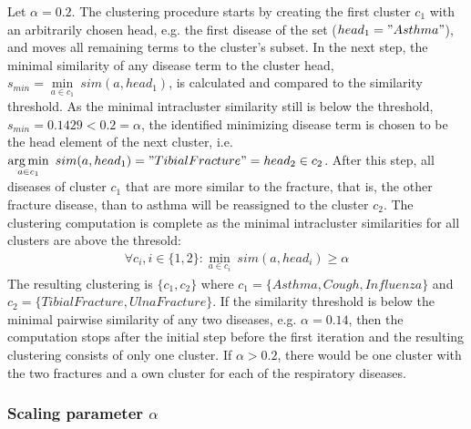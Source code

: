 \begin{exmp}
Let $\alpha=0.2$. The clustering procedure starts by creating the first cluster $c_1$ with an arbitrarily chosen head, e.g. the first disease of the set 
($head_1="Asthma"$), and moves all remaining terms to the cluster's subset. In the next step, the minimal similarity of any disease term to the cluster head, 
$s_{min}=\min\limits_{a \in c_1}~sim(a, head_1)$, is calculated and compared to the similarity threshold. As the minimal intracluster similarity still is below
the threshold, $s_{min}=0.1429 < 0.2=\alpha$, the identified minimizing disease term is chosen to be the head element of the next cluster, i.e. 
$\operatorname*{arg\,min}\limits_{a \in c_1}~sim(a, head_1)="Tibial Fracture"=head_2 \in c_2$. After this step, all diseases of cluster $c_1$ that are more similar to the
fracture, that is, the other fracture disease, than to asthma will be reassigned to the cluster $c_2$. The clustering computation is complete as the minimal 
intracluster similarities for all clusters are above the thresold: 
\begin{align*}
    \forall c_i, i \in \{1,2\}: \min\limits_{a \in c_i}~sim(a, head_i) \geq \alpha
\end{align*}
The resulting clustering is $\{c_1, c_2\}$ where $c_1=\{Asthma,Cough,Influenza\}$ and $c_2=\{Tibial Fracture, Ulna Fracture\}$. If the similarity threshold is
below the minimal pairwise similarity of any two diseases, e.g. $\alpha=0.14$, then the computation stops after the initial step before the first iteration
and the resulting clustering consists of only one cluster. If $\alpha > 0.2$, there would be one cluster with the two fractures and a own cluster for each of 
the respiratory diseases.


\end{exmp}



\subsubsection{Scaling parameter $\alpha$}
\label{sec:impl_clust_alpha}

